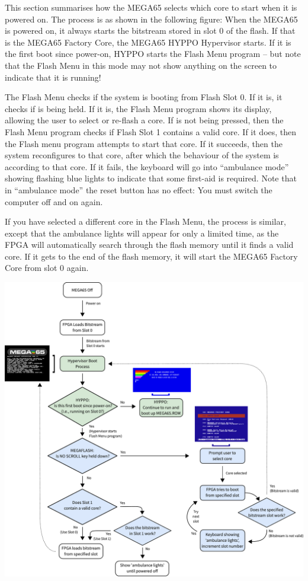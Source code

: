 This section summarises how the MEGA65 selects which core to start when it is powered on.
The process is as shown in the following figure: When the MEGA65 is
powered on, it always starts the bitstream stored in slot 0 of the
flash.  If that is the MEGA65 Factory Core, the MEGA65 HYPPO
Hypervisor starts.  If it is the first boot since power-on, HYPPO
starts the Flash Menu program -- but note that the Flash Menu in
this mode may not show anything on the screen to indicate that it is
running!

The Flash Menu checks if the system is booting from Flash
Slot 0.  If it is, it checks if  is being held.  If
it is, the Flash Menu program shows its display, allowing the user
to select or re-flash a core. If  is not being
pressed, then the Flash Menu program checks if Flash Slot 1 contains a valid
core.  If it does, then the Flash menu program attempts to start
that core.  If it succeeds, then the system reconfigures to that core,
after which the behaviour of the system is according to that core. If
it fails, the keyboard will go into ``ambulance mode'' showing flashing blue
lights to indicate that some first-aid is required.  Note that in ``ambulance
mode'' the reset button has no effect: You must switch the computer off
and on again.

If you have selected a different core in the Flash Menu, the process
is similar, except that the ambulance lights will appear for only a
limited time, as the FPGA will automatically search through the flash
memory until it finds a valid core. If it gets to the end of the flash
memory, it will start the MEGA65 Factory Core from slot 0 again.

\includegraphics[width=\linewidth]{images/illustrations/flashmenu-flowchart.pdf}


